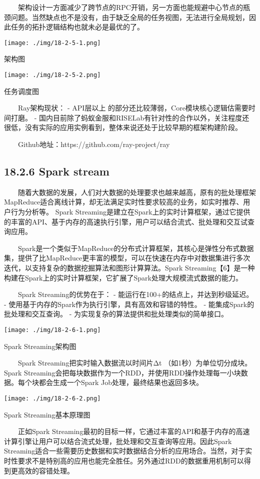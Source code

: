   架构设计一方面减少了跨节点的RPC开销，另一方面也能规避中心节点的瓶颈问题。当然缺点也不是没有，由于缺乏全局的任务视图，无法进行全局规划，因此任务的拓扑逻辑结构也就未必是最优的了。

\texttt{[image: ./img/18-2-5-1.png]}

架构图

\texttt{[image: ./img/18-2-5-2.png]}

任务调度图

  Ray架构现状： - API层以上
的部分还比较薄弱，Core模块核心逻辑估需要时间打磨。 -
国内目前除了蚂蚁金服和RISELab有针对性的合作以外，关注程度还很低，没有实际的应用实例看到，整体来说还处于比较早期的框架构建阶段。

  Github地址：https://github.com/ray-project/ray

\subsection{18.2.6 Spark stream}\label{spark-stream}

  随着大数据的发展，人们对大数据的处理要求也越来越高，原有的批处理框架MapReduce适合离线计算，却无法满足实时性要求较高的业务，如实时推荐、用户行为分析等。
Spark
Streaming是建立在Spark上的实时计算框架，通过它提供的丰富的API、基于内存的高速执行引擎，用户可以结合流式、批处理和交互试查询应用。

  Spark是一个类似于MapReduce的分布式计算框架，其核心是弹性分布式数据集，提供了比MapReduce更丰富的模型，可以在快速在内存中对数据集进行多次迭代，以支持复杂的数据挖掘算法和图形计算算法。Spark
Streaming【6】是一种构建在Spark上的实时计算框架，它扩展了Spark处理大规模流式数据的能力。

  Spark Streaming的优势在于： - 能运行在100+的结点上，并达到秒级延迟。 -
使用基于内存的Spark作为执行引擎，具有高效和容错的特性。 -
能集成Spark的批处理和交互查询。 -
为实现复杂的算法提供和批处理类似的简单接口。

\texttt{[image: ./img/18-2-6-1.png]}

Spark Streaming架构图

  Spark Streaming把实时输入数据流以时间片Δt
（如1秒）为单位切分成块。Spark
Streaming会把每块数据作为一个RDD，并使用RDD操作处理每一小块数据。每个块都会生成一个Spark
Job处理，最终结果也返回多块。

\texttt{[image: ./img/18-2-6-2.png]}

Spark Streaming基本原理图

  正如Spark
Streaming最初的目标一样，它通过丰富的API和基于内存的高速计算引擎让用户可以结合流式处理，批处理和交互查询等应用。因此Spark
Streaming适合一些需要历史数据和实时数据结合分析的应用场合。当然，对于实时性要求不是特别高的应用也能完全胜任。另外通过RDD的数据重用机制可以得到更高效的容错处理。


